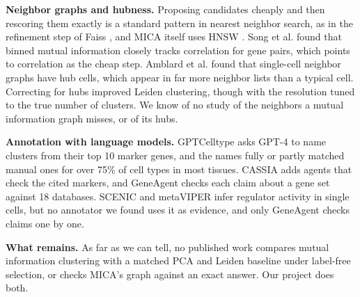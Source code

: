 \textbf{Neighbor graphs and hubness.} Proposing candidates cheaply and then rescoring them exactly is a standard pattern in nearest neighbor search, as in the refinement step of Faiss \cite{douze2024faiss}, and MICA itself uses HNSW \cite{malkov2020efficient}. Song et al. \cite{song2012comparison} found that binned mutual information closely tracks correlation for gene pairs, which points to correlation as the cheap step. Amblard et al. \cite{amblard2022hubness} found that single-cell neighbor graphs have hub cells, which appear in far more neighbor lists than a typical cell. Correcting for hubs improved Leiden clustering, though with the resolution tuned to the true number of clusters. We know of no study of the neighbors a mutual information graph misses, or of its hubs.

\textbf{Annotation with language models.} GPTCelltype \cite{hou2024gpt4} asks GPT-4 to name clusters from their top 10 marker genes, and the names fully or partly matched manual ones for over 75\% of cell types in most tissues. CASSIA \cite{xie2025cassia} adds agents that check the cited markers, and GeneAgent \cite{wang2025geneagent} checks each claim about a gene set against 18 databases. SCENIC \cite{aibar2017scenic} and metaVIPER \cite{ding2018metaviper} infer regulator activity in single cells, but no annotator we found uses it as evidence, and only GeneAgent checks claims one by one.

\textbf{What remains.} As far as we can tell, no published work compares mutual information clustering with a matched PCA and Leiden baseline under label-free selection, or checks MICA's graph against an exact answer. Our project does both.
